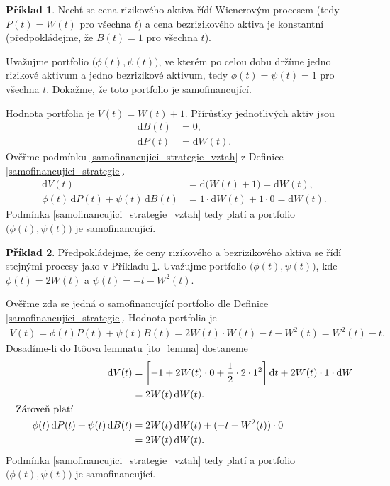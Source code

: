 \documentclass[a4paper,12pt]{report}
\theoremstyle{definition} \newtheorem{definice}[veta]{Definice}
\newtheorem{priklad}{Příklad}
\theoremstyle{remark}
\begin{document}
\begin{priklad}\label{samofinancujici_portfolio_priklad}
Nechť se cena rizikového aktiva řídí Wienerovým procesem (tedy $P(t)=W(t)$ pro všechna $t$) a cena bezrizikového aktiva je konstantní (předpokládejme, že $B(t)=1$ pro všechna $t$).

Uvažujme portfolio $\big(\phi(t),\psi(t)\big)$, ve kterém po celou dobu držíme jedno rizikové aktivum a jedno bezrizikové aktivum, tedy $\phi(t)=\psi(t)=1$ pro všechna $t$. 
Dokažme, že toto portfolio je samofinancující.

Hodnota portfolia je $V(t)=W(t)+1$.
Přírůstky jednotlivých aktiv jsou
\begin{align*}
\mathrm{d}B(t)&= 0, \\
\mathrm{d}P(t)&=\mathrm{d}W(t). 
\end{align*}
Ověřme podmínku \eqref{samofinancujici_strategie_vztah} z Definice \ref{samofinancujici_strategie}.
\begin{align*}
\mathrm{d}V(t)&=\mathrm{d}\big(W(t)+1\big)=\mathrm{d}W(t),\\
\phi(t)\,\mathrm{d}P(t)+\psi(t)\,\mathrm{d}B(t)&=1\cdot\mathrm{d}W(t)+1\cdot0=\mathrm{d}W(t).
\end{align*}
Podmínka \eqref{samofinancujici_strategie_vztah} tedy platí a portfolio $\big(\phi(t),\psi(t)\big)$ je samofinancující.
\end{priklad}

\begin{priklad}
Předpokládejme, že ceny rizikového a bezrizikového aktiva se řídí stejnými procesy jako v Příkladu \ref{samofinancujici_portfolio_priklad}.
Uvažujme portfolio $\big(\phi(t),\psi(t)\big)$, kde $\phi(t)=2W(t)$ a $\psi(t)=-t-W^2(t)$. 

Ověřme zda se jedná o samofinancující portfolio dle Definice \ref{samofinancujici_strategie}.
Hodnota portfolia je 
\begin{align*}
V(t)=\phi(t)P(t)+\psi(t)B(t)=2W(t)\cdot W(t)-t-W^2(t)=W^2(t)-t. 
\end{align*}
Dosadíme-li do It\^oova lemmatu \ref{ito_lemma} dostaneme
\begin{alignat*}{2}
\mathrm{d}V(t)&=\left[-1+2W(t)\cdot0+\frac12\cdot2\cdot1^2\right]\mathrm{d}t+2W(t)\cdot1\cdot\mathrm{d}W\\
&=2W(t)\,\mathrm{d}W(t).\\
\text{Zároveň platí}\hspace{2.1cm}\\
\phi(t)\,\mathrm{d}P(t)+\psi(t)\,\mathrm{d}B(t)&=2W(t)\,\mathrm{d}W(t)+(-t-W^2(t))\cdot0\\
&=2W(t)\,\mathrm{d}W(t).
\end{alignat*}
Podmínka \eqref{samofinancujici_strategie_vztah} tedy platí a portfolio $\big(\phi(t),\psi(t)\big)$ je samofinancující.
\end{priklad}
\end{document}
